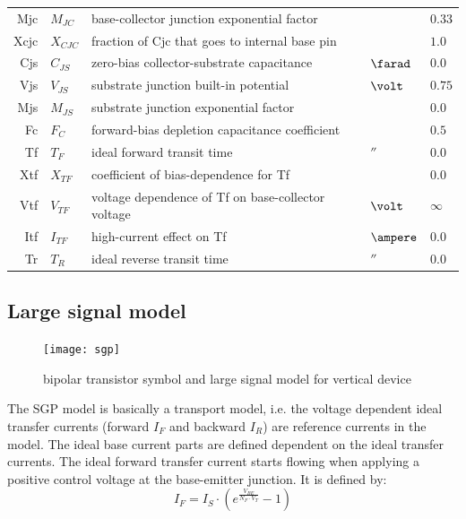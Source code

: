 \documentclass[10pt]{report}
\begin{document}
\begin{tabular}{rllll}
Mjc & $M_{JC}$ & base-collector junction exponential factor & & $0.33$\\
Xcjc & $X_{CJC}$ & fraction of Cjc that goes to internal base pin & & $1.0$\\
Cjs & $C_{JS}$ & zero-bias collector-substrate capacitance & $\farad$ & $0.0$\\
Vjs & $V_{JS}$ & substrate junction built-in potential & $\volt$ & $0.75$\\
Mjs & $M_{JS}$ & substrate junction exponential factor & & $0.0$\\
Fc & $F_C$ & forward-bias depletion capacitance coefficient & & $0.5$\\
Tf & $T_F$ & ideal forward transit time & $\second$ & $0.0$\\
Xtf & $X_{TF}$ & coefficient of bias-dependence for Tf & & $0.0$\\
Vtf & $V_{TF}$ & voltage dependence of Tf on base-collector voltage & $\volt$ & $\infty$\\
Itf & $I_{TF}$ & high-current effect on Tf & $\ampere$ & $0.0$\\
Tr & $T_R$ & ideal reverse transit time & $\second$ & $0.0$\\
\end{tabular}

\subsection{Large signal model}

\begin{figure}[ht]
\begin{center}
\texttt{[image: sgp]}
\end{center}
\caption{bipolar transistor symbol and large signal model for vertical device}
\label{fig:bjt}
\end{figure}
\FloatBarrier

The SGP model is basically a transport model, i.e. the voltage
dependent ideal transfer currents (forward $I_F$ and backward $I_R$)
are reference currents in the model.  The ideal base current parts are
defined dependent on the ideal transfer currents.  The ideal forward
transfer current starts flowing when applying a positive control
voltage at the base-emitter junction.  It is defined by:
\begin{equation}
I_F = I_S\cdot \left(e^{\frac{V_{BE}}{N_F\cdot V_T}} -1\right)
\end{equation}
\end{document}
